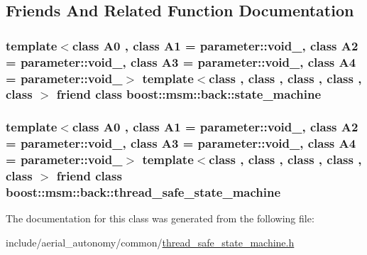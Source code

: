 \subsection{Friends And Related Function Documentation}
\hypertarget{classboost_1_1msm_1_1back_1_1thread__safe__state__machine_a83a2deae1f2169f1234e430beb3b8a95}{
\subsubsection[{boost\-::msm\-::back\-::state\-\_\-machine}]{\setlength{\rightskip}{0pt plus 5cm}template$<$class A0 , class A1  = parameter\-::void\-\_\-, class A2  = parameter\-::void\-\_\-, class A3  = parameter\-::void\-\_\-, class A4  = parameter\-::void\-\_\-$>$ template$<$class , class , class , class , class $>$ friend class boost\-::msm\-::back\-::state\-\_\-machine\hspace{0.3cm}{\ttfamily [friend]}}}\label{classboost_1_1msm_1_1back_1_1thread__safe__state__machine_a83a2deae1f2169f1234e430beb3b8a95}
\hypertarget{classboost_1_1msm_1_1back_1_1thread__safe__state__machine_a3306dad625847fa2192b045a7789ca5f}{
\subsubsection[{boost\-::msm\-::back\-::thread\-\_\-safe\-\_\-state\-\_\-machine}]{\setlength{\rightskip}{0pt plus 5cm}template$<$class A0 , class A1  = parameter\-::void\-\_\-, class A2  = parameter\-::void\-\_\-, class A3  = parameter\-::void\-\_\-, class A4  = parameter\-::void\-\_\-$>$ template$<$class , class , class , class , class $>$ friend class {\bf boost\-::msm\-::back\-::thread\-\_\-safe\-\_\-state\-\_\-machine}\hspace{0.3cm}{\ttfamily [friend]}}}\label{classboost_1_1msm_1_1back_1_1thread__safe__state__machine_a3306dad625847fa2192b045a7789ca5f}


The documentation for this class was generated from the following file\-:\begin{DoxyCompactItemize}
\item 
include/aerial\-\_\-autonomy/common/\hyperlink{thread__safe__state__machine_8h}{thread\-\_\-safe\-\_\-state\-\_\-machine.\-h}\end{DoxyCompactItemize}
